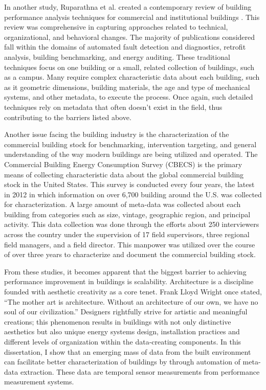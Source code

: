 In another study, Ruparathna et al. created a contemporary review of building performance analysis techniques for commercial and institutional buildings \citep{ruparathna_improving_2016}. This review was comprehensive in capturing approaches related to technical, organizational, and behavioral changes. The majority of publications considered fall within the domains of automated fault detection and diagnostics, retrofit analysis, building benchmarking, and energy auditing. These traditional techniques focus on one building or a small, related collection of buildings, such as a campus. Many require complex characteristic data about each building, such as it geometric dimensions, building materials, the age and type of mechanical systems, and other metadata, to execute the process. Once again, such detailed techniques rely on metadata that often doesn't exist in the field, thus contributing to the barriers listed above.

Another issue facing the building industry is the characterization of the commercial building stock for benchmarking, intervention targeting, and general understanding of the way modern buildings are being utilized and operated. The Commercial Building Energy Consumption Survey (CBECS) is the primary means of collecting characteristic data about the global commercial building stock in the United States. This survey is conducted every four years, the latest in 2012 in which information on over 6,700 building around the U.S. was collected for characterization. A large amount of meta-data was collected about each building from categories such as size, vintage, geographic region, and principal activity. This data collection was done through the efforts about 250 interviewers across the country under the supervision of 17 field supervisors, three regional field managers, and a field director. This manpower was utilized over the course of over three years to characterize and document the commercial building stock.


From these studies, it becomes apparent that the biggest barrier to achieving performance improvement in buildings is scalability. Architecture is a discipline founded with aesthetic creativity as a core tenet. Frank Lloyd Wright once stated, ``The mother art is architecture. Without an architecture of our own, we have no soul of our civilization.'' Designers rightfully strive for artistic and meaningful creations; this phenomenon results in buildings with not only distinctive aesthetics but also unique energy systems design, installation practices and different levels of organization within the data-creating components. In this dissertation, I show that an emerging mass of data from the built environment can facilitate better characterization of buildings by through automation of meta-data extraction. These data are temporal sensor measurements from performance measurement systems.

